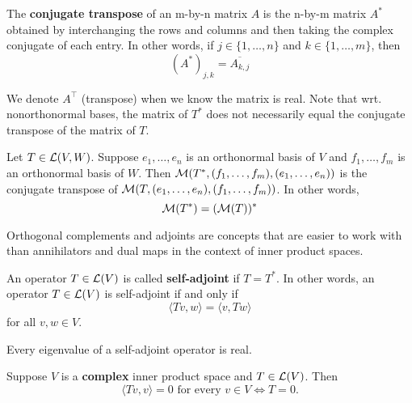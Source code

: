 \documentclass{extarticle}
\begin{document}
\begin{definition}
    The \textbf{conjugate transpose} of an m-by-n matrix \(A\) is the n-by-m matrix 
    \(A^*\) obtained by interchanging the rows and columns and then taking the complex conjugate 
    of each entry. In other words, if \(j \in \{1, \ldots, n\}\) and \(k \in \{1, \ldots, m\}\), 
    then 
    \[(A^*)_{j, k} = \overline{A_{k, j}}\]
\end{definition}

\begin{remark}
    We denote \(A^\top\) (transpose) when we know the matrix is real. Note that wrt. nonorthonormal 
    bases, the matrix of \(T^*\) does not necessarily equal the conjugate transpose of the matrix 
    of \(T\).
\end{remark}


\begin{thm}
    Let \(T \in \mathcal{L}(V, W)\). Suppose \(e_1, \ldots, e_n\) is an orthonormal basis of \(V\) and 
    \(f_1, \ldots, f_m\) is an orthonormal basis of \(W\). Then \(\mathcal{M}(T^*, (f_1, \ldots, f_m), 
    (e_1, \ldots, e_n))\) is the conjugate transpose of \(\mathcal{M}(T, (e_1, \ldots, e_n), (f_1, \ldots, f_m))\). 
    In other words, 
    \[\mathcal{M}(T^*) = (\mathcal{M}(T))^*\]
\end{thm}

\begin{remark}
    Orthogonal complements and adjoints are concepts that are easier to work with than 
    annihilators and dual maps in the context of inner product spaces.
\end{remark}

\begin{definition}
    An operator \( T \in \mathcal{L}(V)\) is called \textbf{self-adjoint} if \(T = T^*\). In other words, 
    an operator \(T \in \mathcal{L}(V)\) is self-adjoint if and only if 
    \[\langle Tv,w \rangle = \langle v,Tw \rangle\] 
    for all \(v, w \in V\).
\end{definition}

\begin{corollary}
    Every eigenvalue of a self-adjoint operator is real. 
\end{corollary}


\begin{corollary}
    Suppose \(V\) is a \textbf{complex} inner product space and \(T \in \mathcal{L}(V)\). Then 
    \[\langle Tv,v \rangle = 0 \text{ for every } v \in V \Longleftrightarrow T = 0.\]
\end{corollary}
\end{document}
